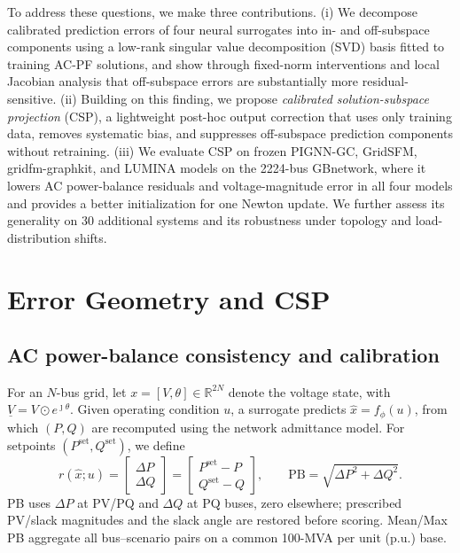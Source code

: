 \documentclass{article}
\begin{document}
To address these questions, we make three contributions.
(i) We decompose calibrated prediction errors of four neural surrogates
into in- and off-subspace components using a low-rank singular value
decomposition (SVD) basis fitted to training AC-PF solutions, and show
through fixed-norm interventions and local Jacobian analysis that
off-subspace errors are substantially more residual-sensitive.
(ii) Building on this finding, we propose \emph{calibrated
solution-subspace projection} (CSP), a lightweight post-hoc output correction that
uses only training data, removes systematic bias, and suppresses
off-subspace prediction components without retraining.
(iii) We evaluate CSP on frozen PIGNN-GC, GridSFM, gridfm-graphkit, and
LUMINA models on the 2224-bus GBnetwork, where it lowers AC power-balance
residuals and voltage-magnitude error in all four models and provides a
better initialization for one Newton update.
We further assess its
generality on 30 additional systems and its robustness under topology
and load-distribution shifts.


\section{Error Geometry and CSP}
\label{sec:method}

\subsection{AC power-balance consistency and calibration}

For an $N$-bus grid, let $x=[V,\theta]\in\mathbb{R}^{2N}$ denote the
voltage state, with $\underline V=V\odot e^{\jmath\theta}$.
Given operating condition $u$, a surrogate predicts $\hat{x}=f_\phi(u)$, from which $(P,Q)$
are recomputed using the network admittance model. For setpoints
$(P^{\mathrm{set}},Q^{\mathrm{set}})$, we define
\[
r(\hat x;u)=
\begin{bmatrix}
\Delta P\\ \Delta Q
\end{bmatrix}
=
\begin{bmatrix}
P^{\mathrm{set}}-P\\
Q^{\mathrm{set}}-Q
\end{bmatrix},
\qquad
\mathrm{PB}=\sqrt{\Delta P^2+\Delta Q^2}.
\]
PB uses $\Delta P$ at PV/PQ and $\Delta Q$ at PQ buses, zero elsewhere;
prescribed PV/slack magnitudes and the slack angle are restored before
scoring. Mean/Max PB aggregate all bus--scenario pairs on a common
100-MVA per unit (p.u.) base.
\end{document}
